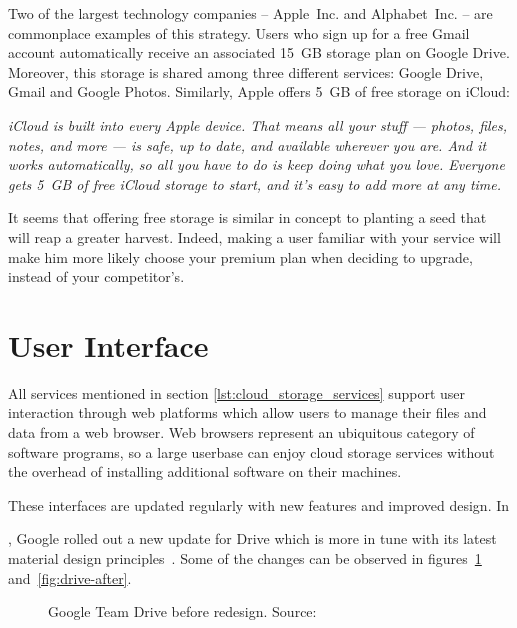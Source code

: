 Two of the largest technology companies -- \mbox{Apple Inc.} and \mbox{Alphabet Inc.} -- are commonplace examples of this strategy. Users who sign up for a free Gmail account automatically receive an associated \mbox{15 GB} storage plan on Google Drive. Moreover, this storage is shared among three different services: Google Drive, Gmail and Google Photos. Similarly, Apple offers \mbox{5 GB} of free storage on iCloud:

\begin{quoting}[vskip=0pt]
\emph{iCloud is built into every Apple device. That means all your stuff — photos, files, notes, and more — is safe, up to date, and available wherever you are. And it works automatically, so all you have to do is keep doing what you love. Everyone gets \mbox{5 GB} of free iCloud storage to start, and it’s easy to add more at any time.}~\cite{icloud_website}
\end{quoting}

It seems that offering free storage is similar in concept to planting a seed that will reap a greater harvest. Indeed, making a user familiar with your service will make him more likely choose your premium plan when deciding to upgrade, instead of your competitor's.

\section{User Interface}

All services mentioned in section \ref{lst:cloud_storage_services} support user interaction through web platforms which allow users to manage their files and data from a web browser. Web browsers represent an ubiquitous category of software programs, so a large userbase can enjoy cloud storage services without the overhead of installing additional software on their machines.

These interfaces are updated regularly with new features and improved design. In \date{May 2018}, Google rolled out a new update for Drive which is more in tune with its latest material design principles~\cite{google_drive_ui_updates,how_google_created_a_custom_material_theme}. Some of the changes can be observed in figures~\ref{fig:drive-before} and~\ref{fig:drive-after}.

\begin{figure}[bpt]
\caption{Google Team Drive before redesign. Source:~\cite{google_drive_ui_updates}}
\label{fig:drive-before}
\centering
{}
\end{figure}

